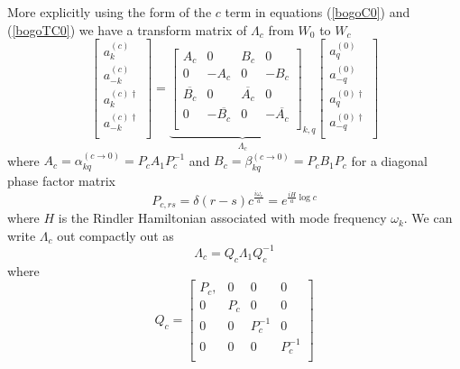 \documentclass[12pt,a4paper]{article}
\begin{document}
More explicitly using the form of the $c$ term in equations (\ref{bogoC0}) and (\ref{bogoTC0}) we have a transform matrix of $\Lambda_c$ from $W_0$ to $W_c$ 
\begin{equation}
  \left[ \begin{array}{l}
    a^{(c)}_k \\
    a^{(c)}_{-k} \\
    \hline 
    a^{(c)\dagger}_k \\
    a^{(c)\dagger}_{-k} \\
 \end{array} \right] = \underbrace{
  \left[
\begin{array}{rr|rr}
    A_c        &       0   &  B_c            &  0 \\
    0        &      -A_c   &  0            & -B_c \\
    \hline 
    \overline{B_c}        &    0      &  \overline{A_c} & 0 \\
    0 &    -\overline{B_c}      &   0           & -\overline{A_c} \\
\end{array} \right]_{k,q} }_{\Lambda_c}
  \left[ \begin{array}{l}
    a^{(0)}_q \\
    a^{(0)}_{-q} \\
    \hline
    a^{(0)\dagger}_q \\
    a^{(0)\dagger}_{-q} \\
 \end{array} \right]
\end{equation}
where $A_c = \alpha_{kq}^{(c \rightarrow 0)} = P_c A_1 P_c^{-1}$  and $B_c = \beta_{kq}^{(c \rightarrow 0)} = P_c B_1 P_c$ for a diagonal phase factor matrix
\begin{equation}
  P_{c,rs} = \delta(r - s) c^{\frac{i\omega_r}{a}} = e^{\frac{i H}{a} \log c}
\end{equation}
where $H$ is the Rindler Hamiltonian associated with mode frequency $\omega_k$. We can write $\Lambda_c$ out compactly out as
\begin{equation}
  \Lambda_c = Q_c \Lambda_1 Q_c^{-1}
\end{equation}
where
\begin{equation}
  Q_c = \left[\begin{array}{cccc}
        P_c, & 0 & 0 & 0 \\
        0 & P_c & 0 & 0 \\
        0 & 0 & P_c^{-1} & 0 \\
        0 & 0 & 0 & P_c^{-1} \\
    \end{array} \right] 
\end{equation}
\end{document}
